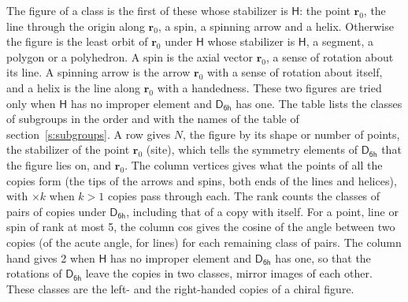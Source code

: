\documentclass[10pt,a4paper]{article}
\numberwithin{equation}{section}
\newcommand{\grp}[1]{\mathsf{#1}}
\newcommand{\pointr}{\mathbf{r}}
\begin{document}
\leavevmode\label{n:head.figure}The figure of a class is the first of these whose stabilizer is $\grp{H}$: the point $\pointr_0$, the line through the origin along $\pointr_0$, a spin, a spinning arrow and a helix. Otherwise the figure is the least orbit of $\pointr_0$ under $\grp{H}$ whose stabilizer is $\grp{H}$, a segment, a polygon or a polyhedron. A spin is the axial vector $\pointr_0$, a sense of rotation about its line. A spinning arrow is the arrow $\pointr_0$ with a sense of rotation about itself, and a helix is the line along $\pointr_0$ with a handedness. These two figures are tried only when $\grp{H}$ has no improper element and $\grp{D_{6h}}$ has one. The table lists the classes of subgroups in the order and with the names of the table of section~\ref{s:subgroups}. \label{n:head.site}A row gives $N$, the figure by its shape or number of points, the stabilizer of the point $\pointr_0$ (site), which tells the symmetry elements of $\grp{D_{6h}}$ that the figure lies on, and $\pointr_0$. \label{n:head.vertices}The column vertices gives what the points of all the copies form (the tips of the arrows and spins, both ends of the lines and helices), with ${\times}k$ when $k > 1$ copies pass through each. \label{n:head.rank}The rank counts the classes of pairs of copies under $\grp{D_{6h}}$, including that of a copy with itself. \label{n:head.cos}For a point, line or spin of rank at most 5, the column cos gives the cosine of the angle between two copies (of the acute angle, for lines) for each remaining class of pairs. \label{n:head.hand}The column hand gives 2 when $\grp{H}$ has no improper element and $\grp{D_{6h}}$ has one, so that the rotations of $\grp{D_{6h}}$ leave the copies in two classes, mirror images of each other. These classes are the left- and the right-handed copies of a chiral figure.
\end{document}
